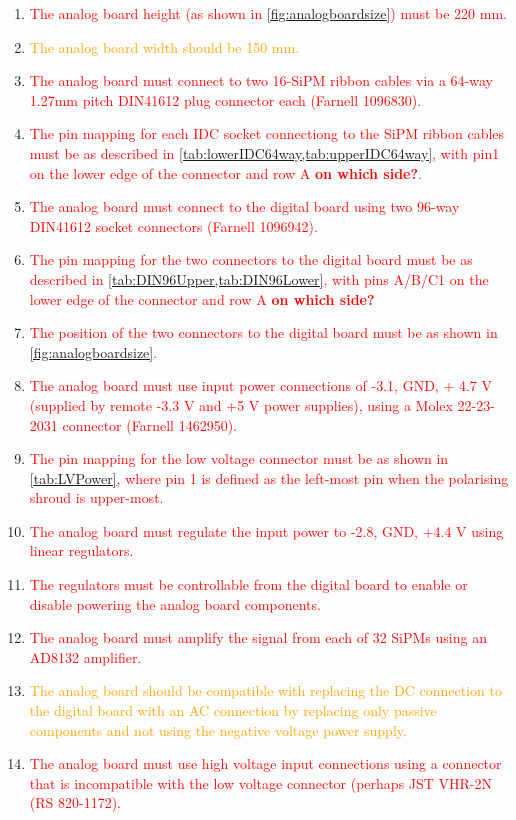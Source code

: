 \documentclass[a4paper]{article}
\newcommand{\must}[1]{\textcolor{red}{#1}}
\newcommand{\should}[1]{\textcolor{orange}{#1}}
\begin{document}
\begin{enumerate}
    \item \must{The analog board height (as shown in \cref{fig:analogboardsize}) must be 220 mm.}
    \item \should{The analog board width should be 150 mm.}
    \item \must{The analog board must connect to two 16-SiPM ribbon cables via a 64-way 1.27mm pitch DIN41612 plug connector each (Farnell 1096830).}
    \item \must{The pin mapping for each IDC socket connectiong to the SiPM ribbon cables must be as described in \cref{tab:lowerIDC64way,tab:upperIDC64way}, with pin1 on the lower edge of the connector and row A {\bf on which side?}.}
    \item \must{The analog board must connect to the digital board using two 96-way DIN41612 socket connectors (Farnell 1096942).}
    \item \must{The pin mapping for the two connectors to the digital board must be as described in \cref{tab:DIN96Upper,tab:DIN96Lower}, with pins A/B/C1 on the lower edge of the connector and row A {\bf on which side?}}
    \item \must{The position of the two connectors to the digital board must be as shown in \cref{fig:analogboardsize}.}
    \item \must{The analog board must use input power connections of -3.1, GND, + 4.7 V (supplied by remote -3.3 V and +5 V power supplies), using a Molex 22-23-2031 connector (Farnell 1462950).}
    \item \must{The pin mapping for the low voltage connector must be as shown in \cref{tab:LVPower}, where pin 1 is defined as the left-most pin when the polarising shroud is upper-most.}
    \item \must{The analog board must regulate the input power to -2.8, GND, +4.4 V using linear regulators.}
    \item \must{The regulators must be controllable from the digital board to enable or disable powering the analog board components.}
    \item \must{The analog board must amplify the signal from each of 32 SiPMs using an AD8132 amplifier.}
    \item \should{The analog board should be compatible with replacing the DC connection to the digital board with an AC connection by replacing only passive components and not using the negative voltage power supply.}
    \item \must{The analog board must use high voltage input connections using a connector that is incompatible with the low voltage connector (perhaps JST VHR-2N (RS 820-1172).}

\end{enumerate}
\end{document}
